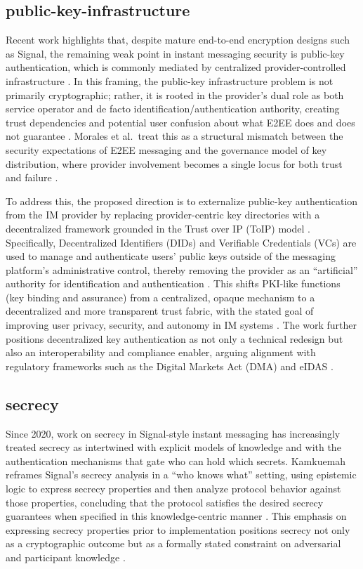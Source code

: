 \subsection{public-key-infrastructure}
Recent work highlights that, despite mature end-to-end encryption designs such as Signal, the remaining weak point in instant messaging security is public-key authentication, which is commonly mediated by centralized provider-controlled infrastructure \cite{morales2024}. In this framing, the public-key infrastructure problem is not primarily cryptographic; rather, it is rooted in the provider’s dual role as both service operator and de facto identification/authentication authority, creating trust dependencies and potential user confusion about what E2EE does and does not guarantee \cite{morales2024}. Morales et al.\ treat this as a structural mismatch between the security expectations of E2EE messaging and the governance model of key distribution, where provider involvement becomes a single locus for both trust and failure \cite{morales2024}.

To address this, the proposed direction is to externalize public-key authentication from the IM provider by replacing provider-centric key directories with a decentralized framework grounded in the Trust over IP (ToIP) model \cite{morales2024}. Specifically, Decentralized Identifiers (DIDs) and Verifiable Credentials (VCs) are used to manage and authenticate users’ public keys outside of the messaging platform’s administrative control, thereby removing the provider as an ``artificial'' authority for identification and authentication \cite{morales2024}. This shifts PKI-like functions (key binding and assurance) from a centralized, opaque mechanism to a decentralized and more transparent trust fabric, with the stated goal of improving user privacy, security, and autonomy in IM systems \cite{morales2024}. The work further positions decentralized key authentication as not only a technical redesign but also an interoperability and compliance enabler, arguing alignment with regulatory frameworks such as the Digital Markets Act (DMA) and eIDAS \cite{morales2024}.

\subsection{secrecy}
Since 2020, work on secrecy in Signal-style instant messaging has increasingly treated secrecy as intertwined with explicit models of knowledge and with the authentication mechanisms that gate who can hold which secrets. Kamkuemah reframes Signal’s secrecy analysis in a ``who knows what'' setting, using epistemic logic to express secrecy properties and then analyze protocol behavior against those properties, concluding that the protocol satisfies the desired secrecy guarantees when specified in this knowledge-centric manner \cite{kamkuemah2021}. This emphasis on expressing secrecy properties prior to implementation positions secrecy not only as a cryptographic outcome but as a formally stated constraint on adversarial and participant knowledge \cite{kamkuemah2021}.

